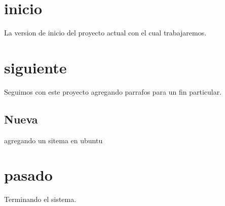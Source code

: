 \documentclass[a4paper]{article}
\begin{document}
    \section{inicio}
    La version de inicio del proyecto actual con el cual trabajaremos.

    \section{siguiente}
    Seguimos con este proyecto agregando parrafos para un fin particular.
        \subsection{Nueva}
        agregando un sitema en ubuntu

    \section{pasado}
    Terminando el sistema.
\end{document}
